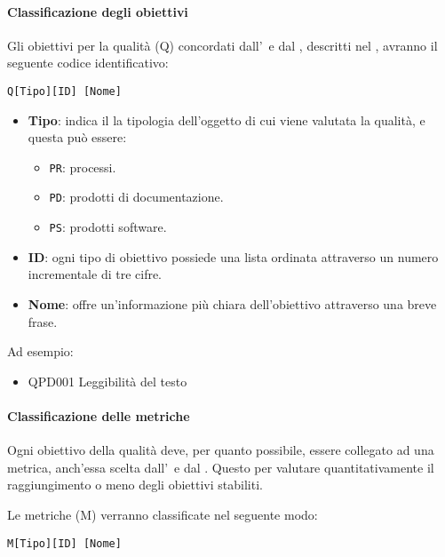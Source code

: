 			\paragraph{Classificazione degli obiettivi}
			Gli obiettivi per la qualità (Q) concordati dall'\Amm\ e dal \Ver, descritti nel \PdQ, avranno il seguente codice identificativo:

			\begin{center}
				\texttt{Q[Tipo][ID] [Nome]}
			\end{center}

			\begin{itemize}
				\item \textbf{Tipo}: indica il la tipologia dell'oggetto di cui viene valutata la qualità, e questa può essere:
				\begin{itemize}
					\item \texttt{PR}: processi.
					\item \texttt{PD}: prodotti di documentazione.
					\item \texttt{PS}: prodotti software.
				\end{itemize}

				\item \textbf{ID}: ogni tipo di obiettivo possiede una lista ordinata attraverso un numero incrementale di tre cifre.
				\item \textbf{Nome}: offre un'informazione più chiara dell'obiettivo attraverso una breve frase.
			\end{itemize}

			Ad esempio:

			\begin{itemize}
				\item QPD001 Leggibilità del testo
			\end{itemize}


			\paragraph{Classificazione delle metriche}\label{Classificazione metriche}
			Ogni obiettivo della qualità deve, per quanto possibile, essere collegato ad una metrica, anch'essa scelta dall'\Amm\ e dal \Ver. Questo per valutare
			quantitativamente il raggiungimento o meno degli obiettivi stabiliti.

			Le metriche (M) verranno classificate nel seguente modo:

			\begin{center}
				\texttt{M[Tipo][ID] [Nome]}
			\end{center}

